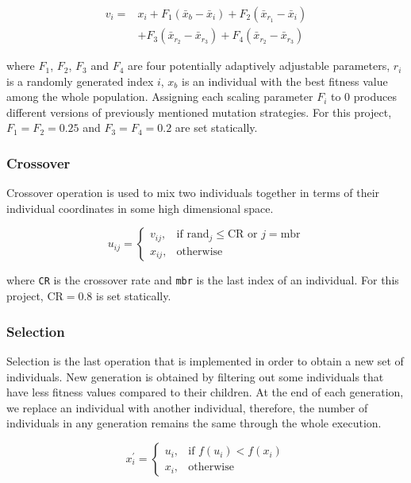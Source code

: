 \documentclass[conference]{IEEEtran}
\begin{document}
\begin{equation}
	\begin{split}
		v_i = &x_i + F_1 (\bar{x}_b - \bar{x}_i) + F_2 (\bar{x}_{r_1} - \bar{x}_i) \\
			& + F_3 (\bar{x}_{r_2} - \bar{x}_{r_3}) + F_4 (\bar{x}_{r_2} - \bar{x}_{r_3})
	\end{split}
	\label{eq:mutation_operation}
\end{equation}

where $F_1$, $F_2$, $F_3$ and $F_4$ are four potentially adaptively adjustable parameters, $r_i$ is a randomly generated index $i$, $x_b$ is an individual with the best fitness value among the whole population. 
Assigning each scaling parameter $F_i$ to 0 produces different versions of previously mentioned mutation strategies. For this project, $F_1 = F_2 = 0.25$ and $F_3 = F_4 = 0.2$ are set statically.

\subsubsection{Crossover}
Crossover operation is used to mix two individuals together in terms of their individual coordinates in some high dimensional space.

\begin{equation}
	u_{ij} = 
	\begin{cases}
		v_{ij}, &\text{if rand}_j \leq \text{CR or } j = \text{mbr} \\
		x_{ij}, &\text{otherwise}
	\end{cases}
	\label{eq:crossover_operation}
\end{equation}

where \lstinline{CR} is the crossover rate and \lstinline{mbr} is the last index of an individual. For this project, $\text{CR} = 0.8$ is set statically.

\subsubsection{Selection}
Selection is the last operation that is implemented in order to obtain a new set of individuals. New generation is obtained by filtering out some individuals that have less fitness values compared to their 
children. At the end of each generation, we replace an individual with another individual, therefore, the number of individuals in any generation remains the same through the whole execution.

\begin{equation}
	x^{\prime}_i = 
	\begin{cases}
		u_i, &\text{if } f(u_i) < f(x_i) \\
		x_i, &\text{otherwise}
	\end{cases}
	\label{eq:selection_operation}
\end{equation}
\end{document}
